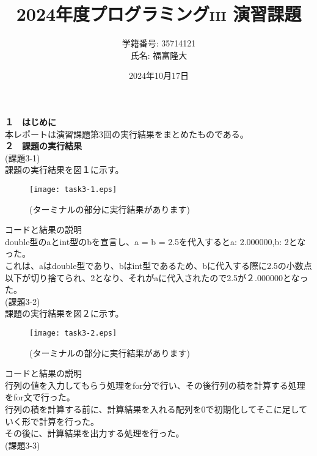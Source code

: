 \documentclass[a4j]{jsarticle}
\title{2024年度プログラミング\textsc{iii} 演習課題}
\author{学籍番号: 35714121 \\ 氏名: 福富隆大}
\date{2024年10月17日}
\begin{document}
\maketitle

\textbf{１　はじめに} \\

本レポートは演習課題第3回の実行結果をまとめたものである。\\

\textbf{２　課題の実行結果} \\

\textmd{(課題3-1)} \\

課題の実行結果を図１に示す。 \\

\begin{figure}[htbp]
  \centering
  \texttt{[image: task3-1.eps]}
  \caption{(ターミナルの部分に実行結果があります)}
  \label{fig:sample}
\end{figure}

\textmd{コードと結果の説明} \\

double型のaとint型のbを宣言し、a = b = 2.5を代入するとa: 2.000000,b: 2となった。  \\
これは、aはdouble型であり、bはint型であるため、bに代入する際に2.5の小数点以下が切り捨てられ、2となり、それがaに代入されたので2.5が２.000000となった。 \\

\textmd{(課題3-2)} \\

課題の実行結果を図２に示す。\\

\begin{figure}[htbp]
  \centering
  \texttt{[image: task3-2.eps]}
  \caption{(ターミナルの部分に実行結果があります)}
  \label{fig:sample}
\end{figure}

\textmd{コードと結果の説明} \\
行列の値を入力してもらう処理をfor分で行い、その後行列の積を計算する処理をfor文で行った。  \\
行列の積を計算する前に、計算結果を入れる配列を0で初期化してそこに足していく形で計算を行った。 \\
その後に、計算結果を出力する処理を行った。  \\

\textmd{(課題3-3)} \\
\end{document}
